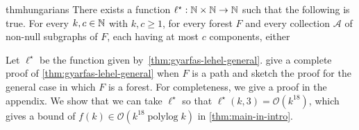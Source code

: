 \documentclass{patmorin}
\DeclareMathOperator{\polylog}{polylog}
\newcommand{\Oh}{\mathcal{O}}
\begin{document}

\begin{restatable}{thm}{hungarians}\label{thm:gyarfas-lehel-general}
   There exists a function $\ell^\star:\mathbb{N}\times\mathbb{N}\to\mathbb{N}$ such that the following is true. For every $k,c\in\mathbb{N}$ with $k,c\geq1$, for every forest $F$ and
   every collection $\mathcal{A}$ of
   non-null subgraphs of $F$, each having at most $c$ components, either
\end{restatable}
Let $\ell^\star$ be the function given by~\cref{thm:gyarfas-lehel-general}. \citet{gyarfas.lehel:helly} give a complete proof of \cref{thm:gyarfas-lehel-general} when $F$ is a path and sketch the proof for the general case in which $F$ is a forest. For completeness, we give a proof in the appendix. We show that we can take $\ell^\star$ so that $\ell^\star(k,3)=\Oh(k^{18})$, which gives a bound of $f(k)\in\Oh(k^{18}\polylog k)$ in \cref{thm:main-in-intro}.
\end{document}
